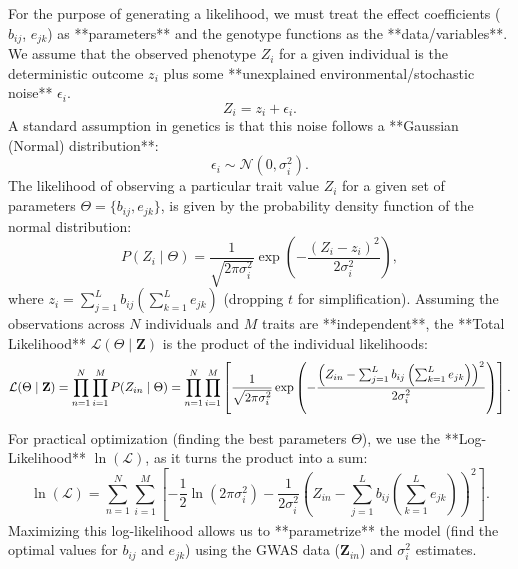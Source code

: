 \documentclass[a4paper,12pt]{elsarticle}
\begin{document}
\begin{tcolorbox}
For the purpose of generating a likelihood, we must treat the effect coefficients ($b_{ij}$, $e_{jk}$) as **parameters** and the genotype functions as the **data/variables**. We assume that the observed phenotype $Z_i$ for a given individual is the deterministic outcome $z_i$ plus some **unexplained environmental/stochastic noise** $\epsilon_i$.
\begin{equation}
Z_i = z_i + \epsilon_i.
\end{equation}
A standard assumption in genetics is that this noise follows a **Gaussian (Normal) distribution**:
\begin{equation}
\epsilon_i \sim \mathcal{N}(0, \sigma^2_i).
\end{equation}
The likelihood of observing a particular trait value $Z_i$ for a given set of parameters $\Theta = \{b_{ij}, e_{jk}\}$, is given by the probability density function of the normal distribution:
\begin{equation}
P(Z_i \mid \Theta) = \frac{1}{\sqrt{2\pi\sigma^2_i}} \exp\left(-\frac{(Z_i - z_i)^2}{2\sigma^2_i}\right),
\end{equation}
where $z_i = \sum_{j=1}^{L} b_{ij} \left( \sum_{k=1}^{L} e_{jk} \right)$ (dropping $t$ for simplification). Assuming the observations across $N$ individuals and $M$ traits are **independent**, the **Total Likelihood** $\mathcal{L}(\Theta \mid \mathbf{Z})$ is the product of the individual likelihoods:
\begin{equation}
\mathcal{L}(\Theta \mid \mathbf{Z}) = \prod_{n=1}^{N} \prod_{i=1}^{M} P(Z_{in} \mid \Theta) = \prod_{n=1}^{N} \prod_{i=1}^{M} \left[ \frac{1}{\sqrt{2\pi\sigma^2_i}} 
\\

\exp\left(-\frac{\left(Z_{in} - \sum_{j=1}^{L} b_{ij} \left( \sum_{k=1}^{L} e_{jk} \right)\right)^2}{2\sigma^2_i}\right) \right].
\end{equation}

For practical optimization (finding the best parameters $\Theta$), we use the **Log-Likelihood** $\ln(\mathcal{L})$, as it turns the product into a sum:
\begin{equation}
\ln(\mathcal{L}) = \sum_{n=1}^{N} \sum_{i=1}^{M} \left[ -\frac{1}{2} \ln(2\pi\sigma^2_i) - \frac{1}{2\sigma^2_i} \left( Z_{in} - \sum_{j=1}^{L} b_{ij} \left( \sum_{k=1}^{L} e_{jk} \right) \right)^2 \right].
\end{equation}
Maximizing this log-likelihood allows us to **parametrize** the model (find the optimal values for $b_{ij}$ and $e_{jk}$) using the GWAS data ($\mathbf{Z}_{in}$) and $\sigma^2_i$ estimates.


\end{tcolorbox}
\end{document}
